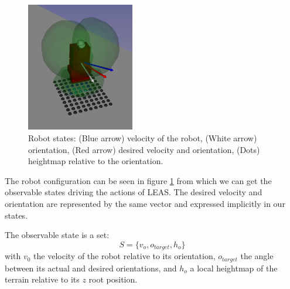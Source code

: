 \begin{figure}
    \centering
    \includegraphics[width=0.42\textwidth]{Figures/Chapter_LEAS/leas_states.png}
    \caption{Robot states: (Blue arrow) velocity of the robot, (White arrow) orientation, (Red arrow) desired velocity and orientation, (Dots) heightmap relative to the orientation.}
    \label{fig:LEAS_states}
\end{figure}

The robot configuration can be seen in figure \ref{fig:LEAS_states} from which we can get the observable states driving the actions of LEAS. The desired velocity and orientation are represented by the same vector and expressed implicitly in our states.

The observable state is a set: 
\begin{equation}
S=\{v_{o}, o_{target}, h_{o}\}
\end{equation}
with $v_{0}$ the velocity of the robot relative to its orientation, $o_{target}$ the angle between its actual and desired orientations, and $h_{o}$ a local heightmap of the terrain relative to its $z$ root position.

